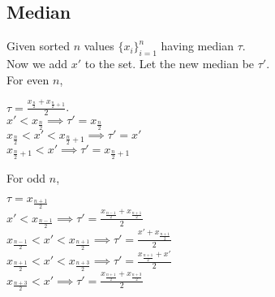 \documentclass[11pt]{article}
\begin{document}
\subsection*{Median}
Given sorted $n$ values $\{x_i\}^n_{i=1}$ having median $\tau$. \\
Now we add $x'$ to the set. Let the new median be $\tau'$. \\

For even $n$,
\begin{center}
$\tau = \frac{x_{\frac{n}{2}} + x_{\frac{n}{2}+1}}{2}$.\\
$x' < x_{\frac{n}{2}} \implies \tau' = x_{\frac{n}{2}}$ \\
$x_{\frac{n}{2}} < x' < x_{\frac{n}{2}+1} \implies \tau' = x'$ \\
$x_{\frac{n}{2}+1} < x' \implies \tau' = x_{\frac{n}{2}+1}$ \\
\end{center}

For odd $n$,
\begin{center}
$\tau = x_{\frac{n+1}{2}}$ \\
$x' < x_{\frac{n-1}{2}} \implies \tau' = \frac{x_{\frac{n-1}{2}} + x_{\frac{n+1}{2}}}{2}$ \\
$x_{\frac{n-1}{2}} < x' < x_{\frac{n+1}{2}} \implies \tau' = \frac{x' + x_{\frac{n+1}{2}}}{2}$ \\
$x_{\frac{n+1}{2}} < x' < x_{\frac{n+3}{2}} \implies \tau' = \frac{x_{\frac{n+1}{2}} + x'}{2}$ \\
$x_{\frac{n+3}{2}} < x' \implies \tau' = \frac{x_{\frac{n+1}{2}} + x_{\frac{n+3}{2}}}{2}$
\end{center}
\end{document}
